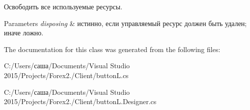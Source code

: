 Освободить все используемые ресурсы. 


\begin{DoxyParams}{Parameters}
{\em disposing} & истинно, если управляемый ресурс должен быть удален; иначе ложно.\\
\hline
\end{DoxyParams}


The documentation for this class was generated from the following files\+:\begin{DoxyCompactItemize}
\item 
C\+:/\+Users/саша/\+Documents/\+Visual Studio 2015/\+Projects/\+Forex2./\+Client/button\+L.\+cs\item 
C\+:/\+Users/саша/\+Documents/\+Visual Studio 2015/\+Projects/\+Forex2./\+Client/button\+L.\+Designer.\+cs\end{DoxyCompactItemize}
